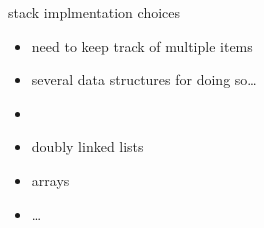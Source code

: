 \begin{frame}{stack implmentation choices}
\begin{itemize}
\item need to keep track of multiple items
\item several data structures for doing so\ldots
\vspace{.5cm}
\item {}
\item doubly linked lists
\item arrays
\item\ldots
\end{itemize}
\end{frame}

\makeatletter
{}
\makeatother


